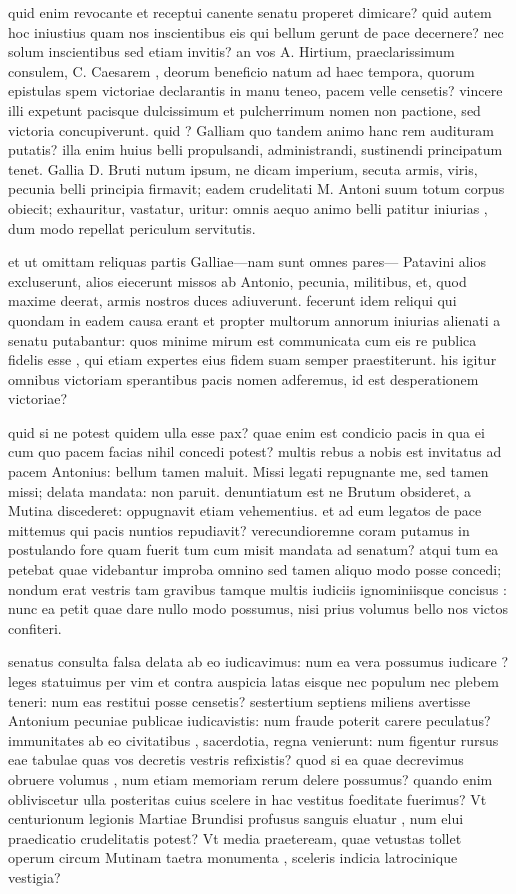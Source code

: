  quid enim revocante et receptui canente senatu properet dimicare? quid autem hoc iniustius quam nos inscientibus eis qui bellum gerunt de pace decernere? nec solum inscientibus sed etiam invitis? an vos A. Hirtium, praeclarissimum consulem, C. Caesarem , deorum beneficio natum ad haec tempora, quorum epistulas spem victoriae declarantis in manu teneo, pacem velle censetis? vincere illi expetunt pacisque dulcissimum et pulcherrimum nomen non pactione, sed victoria concupiverunt. quid ? Galliam quo tandem animo hanc rem audituram putatis? illa enim huius belli propulsandi, administrandi, sustinendi principatum tenet. Gallia D. Bruti nutum ipsum, ne dicam imperium, secuta armis, viris, pecunia belli principia firmavit; eadem crudelitati M. Antoni suum totum corpus obiecit; exhauritur, vastatur, uritur: omnis aequo animo belli patitur iniurias , dum modo repellat periculum servitutis.

 et ut omittam reliquas partis Galliae—nam sunt omnes pares— Patavini alios excluserunt, alios eiecerunt missos ab Antonio, pecunia, militibus, et, quod maxime deerat, armis nostros duces adiuverunt. fecerunt idem reliqui qui quondam in eadem causa erant et propter multorum annorum iniurias alienati a senatu putabantur: quos minime mirum est communicata cum eis re publica fidelis esse , qui etiam expertes eius fidem suam semper praestiterunt. his igitur omnibus victoriam sperantibus pacis nomen adferemus, id est desperationem victoriae?

 quid si ne potest quidem ulla esse pax? quae enim est condicio pacis in qua ei cum quo pacem facias nihil concedi potest? multis rebus a nobis est invitatus ad pacem Antonius: bellum tamen maluit. Missi legati repugnante me, sed tamen missi; delata mandata: non paruit. denuntiatum est ne Brutum obsideret, a Mutina discederet: oppugnavit etiam vehementius. et ad eum legatos de pace mittemus qui pacis nuntios repudiavit? verecundioremne coram putamus in postulando fore quam fuerit tum cum misit mandata ad senatum? atqui tum ea petebat quae videbantur improba omnino sed tamen aliquo modo posse concedi; nondum erat vestris tam gravibus tamque multis iudiciis ignominiisque concisus : nunc ea petit quae dare nullo modo possumus, nisi prius volumus bello nos victos confiteri.

 senatus consulta falsa delata ab eo iudicavimus: num ea vera possumus iudicare ? leges statuimus per vim et contra auspicia latas eisque nec populum nec plebem teneri: num eas restitui posse censetis? sestertium septiens miliens avertisse Antonium pecuniae publicae iudicavistis: num fraude poterit carere peculatus? immunitates ab eo civitatibus , sacerdotia, regna venierunt: num figentur rursus eae tabulae quas vos decretis vestris refixistis? quod si ea quae decrevimus obruere volumus , num etiam memoriam rerum delere possumus? quando enim obliviscetur ulla posteritas cuius scelere in hac vestitus foeditate fuerimus? Vt centurionum legionis Martiae Brundisi profusus sanguis eluatur , num elui praedicatio crudelitatis potest? Vt media praeteream, quae vetustas tollet operum circum Mutinam taetra monumenta , sceleris indicia latrocinique vestigia?

